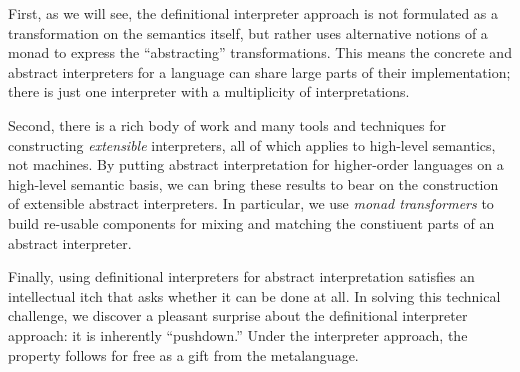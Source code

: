 First, as we will see, the definitional interpreter approach is not formulated
as a transformation on the semantics itself, but rather uses alternative
notions of a monad to express the ``abstracting'' transformations.  This means
the concrete and abstract interpreters for a language can share large parts of
their implementation; there is just one interpreter with a multiplicity of
interpretations.

Second, there is a rich body of work and many tools and techniques for
constructing \emph{extensible} interpreters, all of which applies to high-level
semantics, not machines.  By putting abstract interpretation for higher-order
languages on a high-level semantic basis, we can bring these results to bear on
the construction of extensible abstract interpreters.  In particular, we use
\emph{monad transformers} to build re-usable components for mixing and matching
the constiuent parts of an abstract interpreter.

Finally, using definitional interpreters for abstract interpretation satisfies
an intellectual itch that asks whether it can be done at all.  In solving this
technical challenge, we discover a pleasant surprise about the definitional
interpreter approach: it is inherently ``pushdown.''  Under the interpreter
approach, the property follows for free as a gift from the metalanguage.
